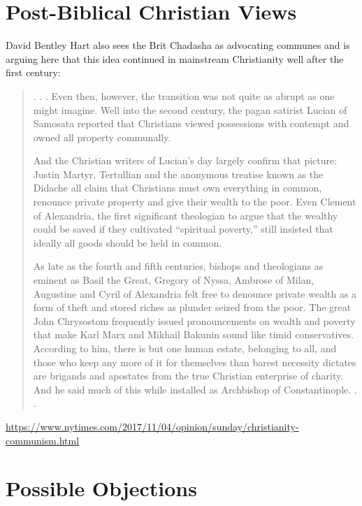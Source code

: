 \documentclass[11pt]{article}
\begin{document}
\section{Post-Biblical Christian Views}
David Bentley Hart also sees the Brit Chadasha as advocating communes and is arguing here that this idea continued in mainstream Christianity well after the first century:
\begin{quote}
. . . Even then, however, the transition was not quite as abrupt as one might imagine. Well into the second century, the pagan satirist Lucian of Samosata reported that Christians viewed possessions with contempt and owned all property communally. 

 And the Christian writers of Lucian’s day largely confirm that picture: Justin Martyr, Tertullian and the anonymous treatise known as the Didache all claim that Christians must own everything in common, renounce private property and give their wealth to the poor. Even Clement of Alexandria, the first significant theologian to argue that the wealthy could be saved if they cultivated “spiritual poverty,” still insisted that ideally all goods should be held in common.

As late as the fourth and fifth centuries, bishops and theologians as eminent as Basil the Great, Gregory of Nyssa, Ambrose of Milan, Augustine and Cyril of Alexandria felt free to denounce private wealth as a form of theft and stored riches as plunder seized from the poor. The great John Chrysostom frequently issued pronouncements on wealth and poverty that make Karl Marx and Mikhail Bakunin sound like timid conservatives. According to him, there is but one human estate, belonging to all, and those who keep any more of it for themselves than barest necessity dictates are brigands and apostates from the true Christian enterprise of charity. And he said much of this while installed as Archbishop of Constantinople. . .
\end{quote}
\url{https://www.nytimes.com/2017/11/04/opinion/sunday/christianity-communism.html}

\section{Possible Objections}
\end{document}
